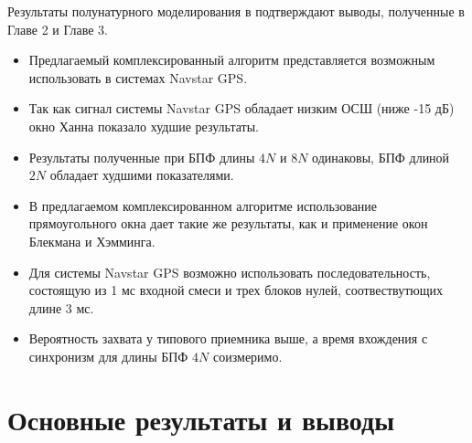 Результаты полунатурного моделирования в подтверждают выводы, полученные в Главе 2 и Главе 3.

\begin{itemize}
\item Предлагаемый комплексированный алгоритм представляется возможным использовать в системах Navstar GPS.
\item Так как сигнал системы Navstar GPS обладает низким ОСШ (ниже -15 дБ) окно Ханна показало худшие результаты.
\item Результаты полученные при БПФ длины ${4N}$ и ${8N}$ одинаковы, БПФ длиной ${2N}$ обладает худшими показателями.
\item В предлагаемом комплексированном алгоритме использование прямоугольного окна дает такие же результаты, как и применение окон Блекмана и Хэмминга.
\item Для системы Navstar GPS возможно использовать последовательность, состоящую из 1 мс входной смеси и трех блоков нулей, соотвествутющих длине 3 мс.
\item Вероятность захвата у типового приемника выше, а время вхождения с синхронизм для длины БПФ ${4N}$ соизмеримо.
\end{itemize}

\clearpage

\chapter*{Основные результаты и выводы}

